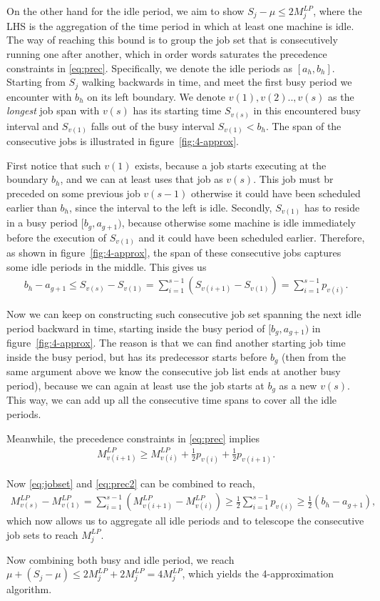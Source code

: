 On the other hand for the idle period, we aim to show $S_j - \mu \leq 2 M^{LP}_j$, where the LHS is the aggregation of the time period in which at least one machine is idle. The way of reaching this bound is to group the job set that is consecutively running one after another, which in order words saturates the precedence constraints in \eqref{eq:prec}. Specifically, we denote the idle periods as $[a_h, b_h]$. Starting from $S_j$ walking backwards in time, and meet the first busy period we encounter with $b_h$ on its left boundary. We denote $v(1), v(2) .., v(s)$ as the \emph{longest} job span with $v(s)$ has its starting time $S_{v(s)}$ in this encountered busy interval and $S_{v(1)}$ falls out of the busy interval $S_{v(1)} < b_h$. The span of the consecutive jobs is illustrated in figure~\ref{fig:4-approx}. 

First notice that such $v(1)$ exists, because a job starts executing at the boundary $b_h$, and we can at least uses that job as $v(s)$. This job must br preceded on some previous job $v(s-1)$ otherwise it could have been scheduled earlier than $b_h$, since the interval to the left is idle. Secondly, $S_{v(1)}$ has to reside in a busy period $[b_g, a_{g+1})$, because otherwise some machine is idle immediately before the execution of $S_{v(1)}$ and it could have been scheduled earlier. Therefore, as shown in figure~\ref{fig:4-approx}, the span of these consecutive jobs captures some idle periods in the middle. This gives us 
\begin{align}
b_h - a_{g+1} \leq S_{v(s)} - S_{v(1)} = \sum_{i=1}^{s-1}(S_{v(i+1)} - S_{v(1)}) = \sum_{i=1}^{s-1} p_{v(i)}. \label{eq:jobset}
\end{align}

Now we can keep on constructing such consecutive job set spanning the next idle period backward in time, starting inside the busy period of $[b_g, a_{g+1})$ in figure~\ref{fig:4-approx}. The reason is that we can find another starting job time inside the busy period, but has its predecessor starts before $b_g$ (then from the same argument above we know the consecutive job list ends at another busy period), because we can again at least use the job starts at $b_g$ as a new $v(s)$. This way, we can add up all the consecutive time spans to cover all the idle periods. 

Meanwhile, the precedence constraints in \eqref{eq:prec} implies
\begin{align}
M^{LP}_{v(i+1)} \geq M^{LP}_{v(i)} + \frac{1}{2}p_{v(i)} + \frac{1}{2}p_{v(i+1)}. \label{eq:prec2}
\end{align}

Now \eqref{eq:jobset} and \eqref{eq:prec2} can be combined to reach,
\begin{align}
M^{LP}_{v(s)} - M^{LP}_{v(1)} = \sum_{i=1}^{s-1} \left(M^{LP}_{v(i+1)} - M^{LP}_{v(i)}\right) \geq \frac{1}{2}\sum_{i=1}^{s-1} p_{v(i)} \geq \frac{1}{2} (b_h-a_{g+1}),
\end{align}
which now allows us to aggregate all idle periods and to telescope the consecutive job sets to reach $M_j^{LP}$. 

Now combining both busy and idle period, we reach $\mu + (S_j - \mu) \leq 2M_j^{LP} + 2M_j^{LP} = 4M_j^{LP}$, which yields the 4-approximation algorithm.
